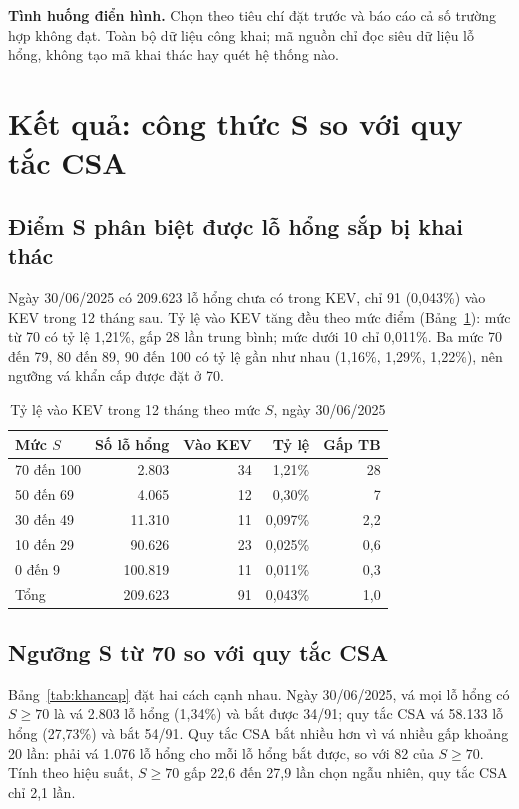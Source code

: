 \documentclass[conference]{IEEEtran}
\begin{document}
\textbf{Tình huống điển hình.} Chọn theo tiêu chí đặt trước và báo cáo cả số trường hợp không đạt. Toàn bộ dữ liệu
công khai; mã nguồn chỉ đọc siêu dữ liệu lỗ hổng, không tạo mã khai thác hay quét hệ thống nào.

\section{Kết quả: công thức S so với quy tắc CSA}\label{sec:ketqua}

\subsection{Điểm S phân biệt được lỗ hổng sắp bị khai thác}
Ngày 30/06/2025 có 209.623 lỗ hổng chưa có trong KEV, chỉ 91 (0,043\%) vào KEV trong 12 tháng sau. Tỷ lệ vào KEV
tăng đều theo mức điểm (Bảng~\ref{tab:mucS}): mức từ 70 có tỷ lệ 1,21\%, gấp 28 lần trung bình; mức dưới 10 chỉ
0,011\%. Ba mức 70 đến 79, 80 đến 89, 90 đến 100 có tỷ lệ gần như nhau (1,16\%, 1,29\%, 1,22\%), nên ngưỡng vá khẩn
cấp được đặt ở 70.

\begin{table}[htbp]
\caption{Tỷ lệ vào KEV trong 12 tháng theo mức $S$, ngày 30/06/2025}\label{tab:mucS}
\centering
\footnotesize
\setlength{\tabcolsep}{4pt}
\begin{tabular}{lrrrr}
\toprule
Mức $S$ & Số lỗ hổng & Vào KEV & Tỷ lệ & Gấp TB \\
\midrule
70 đến 100 & 2.803 & 34 & 1,21\% & 28 \\
50 đến 69 & 4.065 & 12 & 0,30\% & 7 \\
30 đến 49 & 11.310 & 11 & 0,097\% & 2,2 \\
10 đến 29 & 90.626 & 23 & 0,025\% & 0,6 \\
0 đến 9 & 100.819 & 11 & 0,011\% & 0,3 \\
\midrule
Tổng & 209.623 & 91 & 0,043\% & 1,0 \\
\bottomrule
\end{tabular}
\end{table}

\subsection{Ngưỡng S từ 70 so với quy tắc CSA}
Bảng~\ref{tab:khancap} đặt hai cách cạnh nhau. Ngày 30/06/2025, vá mọi lỗ hổng có $S \ge 70$ là vá 2.803 lỗ hổng
(1,34\%) và bắt được 34/91; quy tắc CSA vá 58.133 lỗ hổng (27,73\%) và bắt 54/91. Quy tắc CSA bắt nhiều hơn vì vá
nhiều gấp khoảng 20 lần: phải vá 1.076 lỗ hổng cho mỗi lỗ hổng bắt được, so với 82 của $S \ge 70$. Tính theo hiệu
suất, $S \ge 70$ gấp 22,6 đến 27,9 lần chọn ngẫu nhiên, quy tắc CSA chỉ 2,1 lần.
\end{document}
